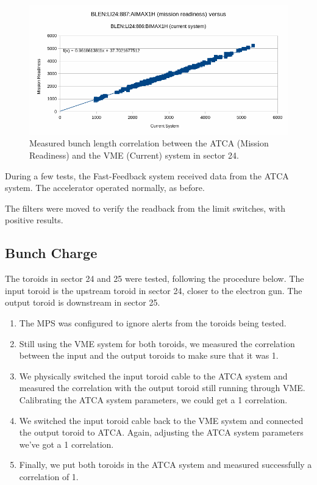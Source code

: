 \documentclass[letter,
        biblatex,   %
        keeplastbox,  %
        ]{jacow}
\begin{document}
\begin{figure}[!htb]
  \centering
  \includegraphics*[width=\columnwidth]{blen_result}
  \caption{Measured bunch length correlation between the ATCA (Mission Readiness) and the VME (Current) system in sector 24.}
  \label{fig:blen_result}
\end{figure}

During a few tests, the Fast-Feedback system received data from the ATCA system. The accelerator operated normally, as before.

The filters were moved to verify the readback from the limit switches, with positive results.

\subsection{Bunch Charge}
The toroids in sector 24 and 25 were tested, following the procedure below. The input toroid is the upstream toroid in sector 24, closer to the electron gun. The output toroid is downstream in sector 25.

\begin{enumerate}
  \item The MPS was configured to ignore alerts from the toroids being tested.
  \item Still using the VME system for both toroids, we measured the correlation between the input and the output toroids to make sure that it was 1.
  \item We physically switched the input toroid cable to the ATCA system and measured the correlation with the output toroid still running through VME. Calibrating the ATCA system parameters, we could get a 1 correlation.
  \item We switched the input toroid cable back to the VME system and connected the output toroid to ATCA. Again, adjusting the ATCA system parameters we've got a 1 correlation.
  \item Finally, we put both toroids in the ATCA system and measured successfully a correlation of 1.
\end{enumerate}
\end{document}
